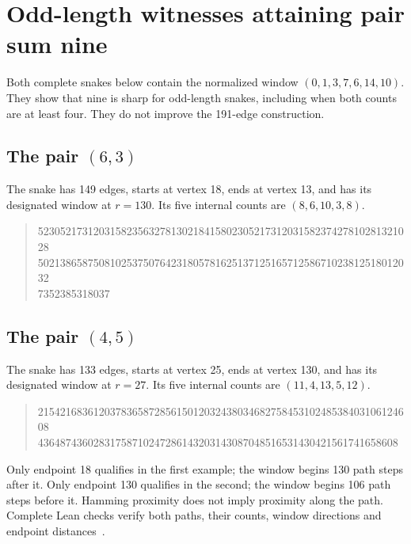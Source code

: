\documentclass[11pt,a4paper]{article}
\theoremstyle{definition}
\theoremstyle{remark}
\begin{document}
\section{Odd-length witnesses attaining pair sum nine}\label{app:odd-pair-witnesses}
Both complete snakes below contain the normalized window $(0,1,3,7,6,14,10)$.
They show that nine is sharp for odd-length snakes, including when both
counts are at least four. They do not improve the 191-edge construction.

\subsection{The pair $(6,3)$}
The snake has 149 edges, starts at vertex 18, ends at vertex 13, and has its designated window at $r=130$. Its five internal counts are $(8,6,10,3,8)$.

\begin{quote}\ttfamily\small
52305217312031582356327813021841580230521731203158237427810281321028\\
50213865875081025375076423180578162513712516571258671023812518012032\\
7352385318037
\end{quote}

\subsection{The pair $(4,5)$}
The snake has 133 edges, starts at vertex 25, ends at vertex 130, and has its designated window at $r=27$. Its five internal counts are $(11,4,13,5,12)$.

\begin{quote}\ttfamily\small
21542168361203783658728561501203243803468275845310248538403106124608\\
43648743602831758710247286143203143087048516531430421561741658608
\end{quote}

Only endpoint 18 qualifies in the first example; the window begins 130
path steps after it. Only endpoint 130 qualifies in the second; the window
begins 106 path steps before it. Hamming proximity does not imply proximity
along the path. Complete Lean checks verify both paths, their counts, window
directions and endpoint distances~\cite{oddwitnessarchive}.
\end{document}
